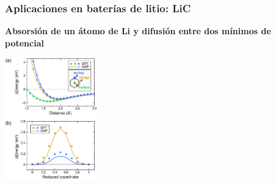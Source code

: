 \documentclass[aspectratio=169]{beamer}
\let\oldtextbf\textbf
\renewcommand{\textbf}[1]{\textcolor{nordblue}{\oldtextbf{#1}}}
\begin{document}
    \begin{frame}
        \frametitle{Aplicaciones en baterías de litio: LiC}

        \textbf{Absorsión de un átomo de Li y difusión entre dos mínimos de 
        potencial}
        
        \begin{center}
            \includegraphics[width=0.3\textwidth]{LiC-sites.png}
        \end{center}
    \end{frame}
    
\end{document}
